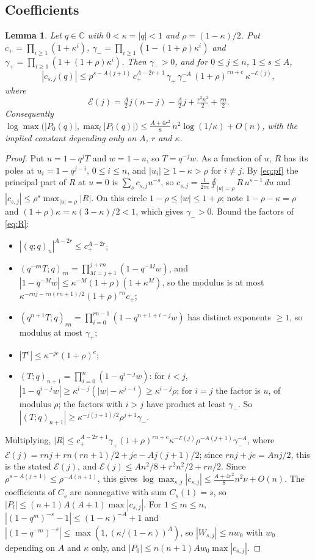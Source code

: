 \documentclass[11pt]{amsart}
\newtheorem{lemma}[theorem]{Lemma}
\theoremstyle{definition}
\theoremstyle{remark}
\numberwithin{equation}{section}
\newcommand{\CC}{\mathbb{C}}
\begin{document}
\subsection*{Coefficients}

\begin{lemma}\label{lem:coef}
Let $q\in\CC$ with $0<\kappa=|q|<1$ and $\rho=(1-\kappa)/2$. Put $c_+=\prod_{i\ge1}(1+\kappa^i)$,
$\gamma_-=\prod_{i\ge1}(1-(1+\rho)\kappa^i)$ and $\gamma_+=\prod_{i\ge1}(1+(1+\rho)\kappa^i)$. Then $\gamma_->0$, and for
$0\le j\le n$, $1\le s\le A$,
\[
|c_{s,j}(q)|\le\rho^{s-A(j+1)}\,c_+^{A-2r+1}\,\gamma_+\,\gamma_-^{-A}\,(1+\rho)^{rn+e}\,\kappa^{-\mathcal E(j)},
\]
where
\[
\mathcal E(j)=\tfrac A2j(n-j)-\tfrac A2j+\tfrac{r^2n^2}2+\tfrac{rn}2.
\]
Consequently $\log\max\bigl(|P_0(q)|,\max_l|P_l(q)|\bigr)\le\frac{A+4r^2}8\,n^2\log(1/\kappa)+O(n)$, with the
implied constant depending only on $A$, $r$ and $\kappa$.
\end{lemma}

\begin{proof}
Put $u=1-q^jT$ and $w=1-u$, so $T=q^{-j}w$. As a function of $u$, $R$ has its poles at $u_i=1-q^{j-i}$, $0\le i\le n$,
and $|u_i|\ge1-\kappa>\rho$ for $i\ne j$. By \eqref{eq:pf} the principal part of $R$ at $u=0$ is
$\sum_sc_{s,j}u^{-s}$, so $c_{s,j}=\frac1{2\pi i}\oint_{|u|=\rho}R\,u^{s-1}\,du$ and $|c_{s,j}|\le\rho^s\max_{|u|=\rho}
|R|$. On this circle $1-\rho\le|w|\le1+\rho$; note $1-\rho-\kappa=\rho$ and $(1+\rho)\kappa=\kappa(3-\kappa)/2<1$, which
gives $\gamma_->0$. Bound the factors of \eqref{eq:R}:
\begin{itemize}
\item $|(q;q)_n|^{A-2r}\le c_+^{A-2r}$;
\item $(q^{-rn}T;q)_{rn}=\prod_{M=j+1}^{j+rn}(1-q^{-M}w)$, and $|1-q^{-M}w|\le\kappa^{-M}(1+\rho)(1+\kappa^M)$, so
the modulus is at most $\kappa^{-rnj-rn(rn+1)/2}(1+\rho)^{rn}c_+$;
\item $(q^{n+1}T;q)_{rn}=\prod_{i=0}^{rn-1}(1-q^{n+1+i-j}w)$ has distinct exponents $\ge1$, so modulus at most $\gamma_+$;
\item $|T^e|\le\kappa^{-je}(1+\rho)^e$;
\item $(T;q)_{n+1}=\prod_{i=0}^n(1-q^{i-j}w)$: for $i<j$, $|1-q^{i-j}w|\ge\kappa^{i-j}(|w|-\kappa^{j-i})\ge
\kappa^{i-j}\rho$; for $i=j$ the factor is $u$, of modulus $\rho$; the factors with $i>j$ have product at least $\gamma_-$.
So $|(T;q)_{n+1}|\ge\kappa^{-j(j+1)/2}\rho^{j+1}\gamma_-$.
\end{itemize}
Multiplying, $|R|\le c_+^{A-2r+1}\gamma_+(1+\rho)^{rn+e}\kappa^{-\mathcal E(j)}\rho^{-A(j+1)}\gamma_-^{-A}$, where
$\mathcal E(j)=rnj+rn(rn+1)/2+je-Aj(j+1)/2$; since $rnj+je=Anj/2$, this is the stated $\mathcal E(j)$, and
$\mathcal E(j)\le An^2/8+r^2n^2/2+rn/2$. Since $\rho^{s-A(j+1)}\le\rho^{-A(n+1)}$, this gives
$\log\max_{s,j}|c_{s,j}|\le\frac{A+4r^2}8n^2\nu+O(n)$. The coefficients of $C_s$ are nonnegative with sum $C_s(1)=s$, so
$|P_l|\le(n+1)A(A+1)\max|c_{s,j}|$. For $1\le m\le n$, $|(1-q^m)^{-s}-1|\le(1-\kappa)^{-A}+1$ and
$|(1-q^{-m})^{-s}|\le\max(1,(\kappa/(1-\kappa))^A)$, so $|W_{s,j}|\le nw_0$ with $w_0$ depending on $A$ and $\kappa$
only, and $|P_0|\le n(n+1)Aw_0\max|c_{s,j}|$.
\end{proof}
\end{document}
